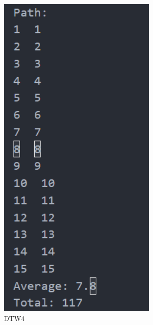 \documentclass[12pt,a4paper]{article}
\theoremstyle{definition}
\begin{document}
\begin{appendices}
\begin{figure}[H] %
\centering %
\includegraphics[width=0.7\textwidth]{5.png} %
\caption{DTW4} %
\label{} %
\end{figure}


\end{appendices}
\end{document}
